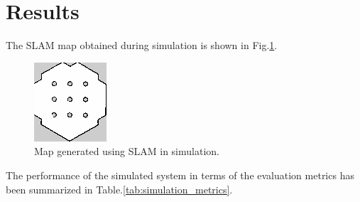\section{Results}
\label{section:results}

The SLAM map obtained during simulation is shown in Fig.\:\ref{fig:simulation_slam_map}.
\begin{figure}
    \centering
    \includegraphics[width=\columnwidth]{images/simulation_SLAM_map.png}
    \caption{Map generated using SLAM in simulation.}
    \label{fig:simulation_slam_map}
\end{figure}
The performance of the simulated system in terms of the evaluation metrics has been summarized in Table.\:\ref{tab:simulation_metrics}.
\begin{table}
    \centering
    \caption{Evaluation metrics obtained during testing of the simulated system.}
    \label{tab:simulation_metrics}
\end{table}

